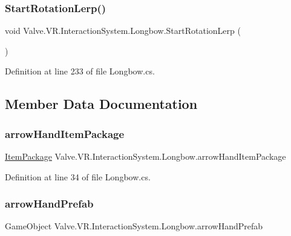 \subsubsection{\texorpdfstring{StartRotationLerp()}{StartRotationLerp()}}
{\footnotesize\ttfamily void Valve.\+V\+R.\+Interaction\+System.\+Longbow.\+Start\+Rotation\+Lerp (\begin{DoxyParamCaption}{ }\end{DoxyParamCaption})}



Definition at line 233 of file Longbow.\+cs.



\subsection{Member Data Documentation}
\mbox{\label{class_valve_1_1_v_r_1_1_interaction_system_1_1_longbow_acf32893c0d8d9925bccb4a6369b68144}} 
\subsubsection{\texorpdfstring{arrowHandItemPackage}{arrowHandItemPackage}}
{\footnotesize\ttfamily \mbox{\hyperlink{class_valve_1_1_v_r_1_1_interaction_system_1_1_item_package}{Item\+Package}} Valve.\+V\+R.\+Interaction\+System.\+Longbow.\+arrow\+Hand\+Item\+Package}



Definition at line 34 of file Longbow.\+cs.

\mbox{\label{class_valve_1_1_v_r_1_1_interaction_system_1_1_longbow_aaab9d5480bf1f4acb18da7cf3cb91b0a}} 
\subsubsection{\texorpdfstring{arrowHandPrefab}{arrowHandPrefab}}
{\footnotesize\ttfamily Game\+Object Valve.\+V\+R.\+Interaction\+System.\+Longbow.\+arrow\+Hand\+Prefab}



